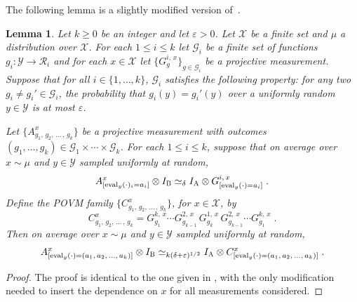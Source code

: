 \documentclass[11pt]{article}
\newtheorem{lemma}[theorem]{Lemma}
\theoremstyle{definition}
\newcommand{\mG}{\ensuremath{\mathcal{G}}}
\newcommand{\mR}{\ensuremath{\mathcal{R}}}
\newcommand{\mX}{\ensuremath{\mathcal{X}}}
\newcommand{\mY}{\ensuremath{\mathcal{Y}}}
\newcommand{\eps}{\varepsilon}
\newcommand{\labelstyle}[1]{\ensuremath{\textsc{#1}}\xspace}
\newcommand{\alice}{\labelstyle{A}}
\newcommand{\bob}{\labelstyle{B}}
\newcommand{\abc}[1][\delta]{\otimes I_\bob \simeq_{#1} I_\alice \otimes}
\newcommand{\eval}{\mathrm{eval}}
\begin{document}
The following lemma is a slightly modified version of~\cite[Fact~4.34]{NW19}.
\begin{lemma}\label{lem:ld-sandwich}
  Let $k \geq 0$ be an integer and let $\eps>0$.
  Let $\mX$ be a finite set and $\mu$ a distribution over $\mX$.
  For each $1 \leq i \leq k$ let $\mG_i$ be a finite set of functions $g_i : \mY
  \rightarrow \mR_i$ and for each $x \in \mX$ let $\{G^{i,\, x}_g\}_{g\in
    \mG_i}$ be a projective measurement.
  Suppose that for all $i\in \{1,\ldots,k\}$, $\mG_i$ satisfies the following
  property: for any two $g_i \neq g_i' \in \mG_i$, the probability that $g_i(y)
  = g_i'(y)$ over a uniformly random $y \in \mY$ is at most $\eps$.

  Let $\bigl\{ A^{x}_{g_1,\, g_2,\, \ldots\,,\, g_k} \bigr\}$ be a projective
  measurement with outcomes $(g_1,\ldots,g_k) \in \mG_1\times\cdots\times
  \mG_k$.
  For each $1 \leq i \leq k$, suppose that on average over $x \sim \mu$ and
  $y\in \mY$ sampled uniformly at random,
  \begin{equation}\label{eq:ld-sandwich-1}
    A^{x}_{[\eval_y(\cdot)_i = a_i]} \abc G^{i,\, x}_{[\eval_y(\cdot)=a_i]}\;.
  \end{equation}
  Define the POVM family $\{C^x_{g_1,\, g_2,\, \ldots\,,\, g_k}\}$, for $x\in \mX$, by
  \begin{equation*}
    C^x_{g_1,\, g_2,\, \ldots\,,\, g_k} = G^{k,\, x}_{g_1} \cdots
    G^{2,\, x}_{g_{k-1}} \, G^{1,\, x}_{g_k} \, G^{2,\, x}_{g_{k-1}} \cdots
    G^{k,\, x}_{g_1}\;.
  \end{equation*}
  Then on average over $x\sim \mu$ and $y\in \mY$ sampled uniformly at random,
  \begin{equation}\label{eq:ld-sandwich-2}
    A^x_{[\eval_y(\cdot) = (a_1,\, a_2,\, \ldots,\, a_k)]} \abc[k(\delta+\eps)^{1/2}]
    C^x_{[\eval_y(\cdot) = (a_1,\, a_2,\, \ldots,\, a_k)]}\;.
\end{equation}
\end{lemma}

\begin{proof}
  The proof is identical to the one given in \cite[Fact~4.34]{NW19}, with the
  only modification needed to insert the dependence on $x$ for all measurements
  considered.
\end{proof}
\end{document}

